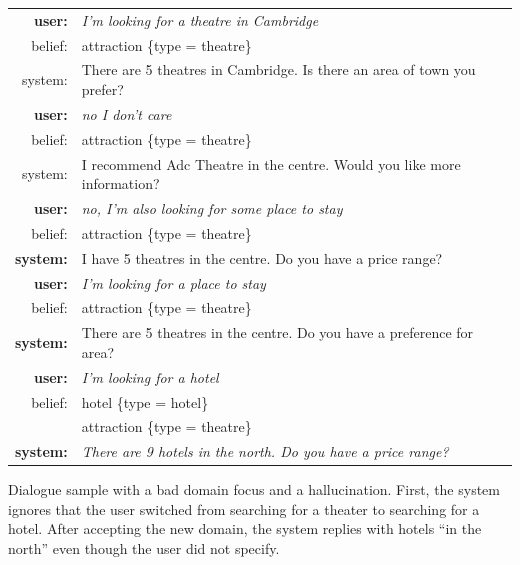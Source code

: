 \documentclass[11pt,a4paper]{article}
\begin{document}
\begin{example}[tpbh]
\small
\setlength{\tabcolsep}{2pt}
\begin{mdframed}[style=ExampleFrame]
\begin{tabularx}{\textwidth}{rX}
\bf user: & \it I'm looking for a theatre in Cambridge \\
belief: & attraction \{type = theatre\} \\
system: & There are 5 theatres in Cambridge. Is there an area of town you prefer? \\
\bf user: & \it no I don't care \\
belief: & attraction \{type = theatre\} \\
system: & I recommend Adc Theatre in the centre. Would you like more information? \\
\bf user: & \it no, I'm also looking for some place to stay \\
belief: & attraction \{type = theatre\} \\
\bf system: & I have 5 theatres in the centre. Do you have a price range? \\
\bf user: &  \it I'm looking for a place to stay \\
belief: & attraction \{type = theatre\} \\
\bf system: & There are 5 theatres in the centre. Do you have a preference for area? \\
\bf user: & \it I'm looking for a hotel \\
belief: & hotel \{type = hotel\} \\ 
& attraction \{type = theatre\} \\
\bf system: & \it There are 9 hotels in the north. Do you have a price range?\\
\end{tabularx}
\end{mdframed}
\caption{Dialogue sample with a bad domain focus and a hallucination. First, the system ignores that the user switched from searching for a theater to searching for a hotel. After accepting the new domain, the system replies with hotels “in the north” even though the user did not specify.\label{ex:error2}}
\end{example}
\end{document}
